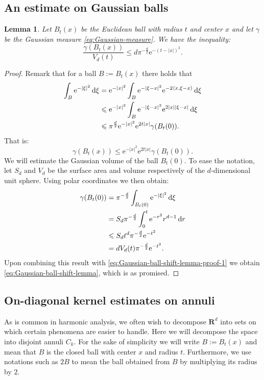 \documentclass[a4paper,oneside,10pt]{amsproc}
\newtheorem{lemma}{Lemma}
\theoremstyle{remark}
\newcommand{\D}{\,\textup{d}}
\newcommand{\la}{\langle}
\newcommand{\ra}{\rangle}
\renewcommand{\leq}{\leqslant}
\renewcommand{\leq}{\leqslant}
\newcommand{\R}{\mathbf R}
\newcommand{\e}{\mathrm{e}} %
\renewcommand{\leq}{\leqslant}%
\begin{document}
\subsection{An estimate on Gaussian balls}
\begin{lemma}\label{lem:Gaussian-ball-shift-lemma}
  Let $B_t(x)$ be the Euclidean ball with radius $t$ and center $x$
  and let $\gamma$ be the Gaussian measure
  \eqref{eq:Gaussian-measure}. We have the inequality:
  \begin{equation}\label{eq:Gaussian-ball-shift-lemma}
    \frac{\gamma(B_t(x))}{V_d(t)} \leq d \pi^{-\frac{d}2} \e^{-(t -
      |x|)^2}.
  \end{equation}
\end{lemma}
\begin{proof}
  Remark that for a ball $B:= B_t(x)$ there holds that
  \begin{align*}
    \int_B \e^{-|\xi|^2} \D\xi &= \e^{-|x|^2} \int_{B} \e^{-|\xi -
      x|^2} \e^{-2 \la x, \xi - x \ra} \D\xi\\
    &\leq \e^{-|x|^2} \int_{B} \e^{-|\xi - x|^2} \e^{2 |x| |\xi - x|}
    \D\xi\\
    &\leq \pi^{\frac{d}2} \e^{-|x|^2} \e^{2 t |x|} \gamma(B_t(0)).
  \end{align*}
  That is:
  \begin{equation}\label{eq:Gaussian-ball-shift-lemma-proof-1}
    \gamma(B_t(x)) \leq \e^{-|x|^2} \e^{2 t |x|} \gamma(B_t(0)).
  \end{equation}
  We will estimate the Gaussian volume of the ball $B_t(0)$. To ease
  the notation, let $S_d$ and $V_d$ be the surface area and volume
  respectively of the $d$-dimensional unit sphere. Using polar coordinates
  we then obtain: 
  \begin{align*}
    \gamma(B_t(0)) &= \pi^{-\frac{d}2} \int_{B_t(0)} \e^{-|\xi|^2} \D\xi\\
    &= S_d \pi^{-\frac{d}2} \int_0^t \e^{-r^2} r^{d - 1} \D{r}\\
    &\leq S_d t^d \pi^{-\frac{d}2}\e^{-t^2}\\
    &= d V_d(t) \pi^{-\frac{d}2}\e^{-t^2}.
  \end{align*}
  Upon combining this result with
  \eqref{eq:Gaussian-ball-shift-lemma-proof-1} we obtain
  \eqref{eq:Gaussian-ball-shift-lemma}, which is as promised.
\end{proof}

\subsection{On-diagonal kernel estimates on annuli}
As is common in harmonic analysis, we often wish to decompose
$\R^d$ into sets on which certain phenomena are easier to handle. Here
we will decompose the space into disjoint annuli $C_k$. For the sake
of simplicity we will write $B := B_t(x)$ and mean that $B$ is the
closed ball with center $x$ and radius $t$. Furthermore, we use
notations such as $2B$ to mean the ball obtained from $B$ by
multiplying its radius by $2$.
\end{document}

